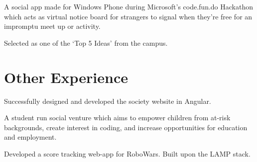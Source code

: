 \documentclass[a4paper]{resume}
\begin{document}
\begin{minipage}[t]{0.66\textwidth}

\begin{tightitemize}
\item A social app made for Windows Phone during Microsoft’s code.fun.do Hackathon which acts as virtual notice board for strangers to signal when they’re free for an impromptu meet up or activity.
\item Selected as one of the ‘Top 5 Ideas’ from the campus.
\end{tightitemize}

\sectionspace %


\section{Other Experience}

Successfully designed and developed the society website in Angular.

\sectionspace %

A student run social venture which aims to empower children from at-risk backgrounds, create interest in coding, and increase opportunities for education and employment.

\sectionspace %


\sectionspace %

Developed a score tracking web-app for RoboWars. Built upon the LAMP stack.

\sectionspace %


\sectionspace %




\end{minipage} %
\end{document}
